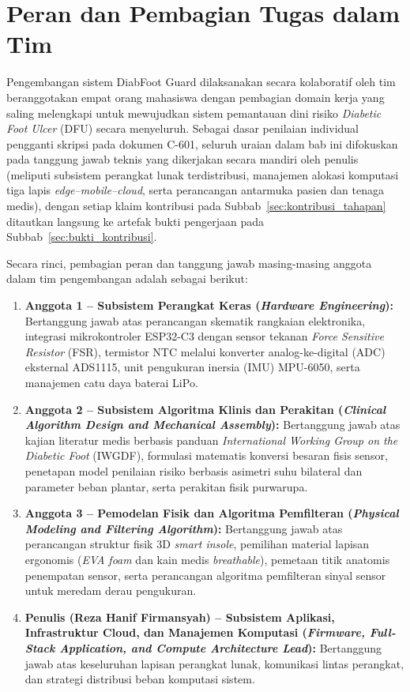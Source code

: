 \section{Peran dan Pembagian Tugas dalam Tim}
\label{sec:peran_tugas}

Pengembangan sistem DiabFoot Guard dilaksanakan secara kolaboratif oleh tim beranggotakan empat orang mahasiswa dengan pembagian domain kerja yang saling melengkapi untuk mewujudkan sistem pemantauan dini risiko \textit{Diabetic Foot Ulcer} (DFU) secara menyeluruh. Sebagai dasar penilaian individual pengganti skripsi pada dokumen C-601, seluruh uraian dalam bab ini difokuskan pada tanggung jawab teknis yang dikerjakan secara mandiri oleh penulis (meliputi subsistem perangkat lunak terdistribusi, manajemen alokasi komputasi tiga lapis \textit{edge--mobile--cloud}, serta perancangan antarmuka pasien dan tenaga medis), dengan setiap klaim kontribusi pada Subbab~\ref{sec:kontribusi_tahapan} ditautkan langsung ke artefak bukti pengerjaan pada Subbab~\ref{sec:bukti_kontribusi}.

Secara rinci, pembagian peran dan tanggung jawab masing-masing anggota dalam tim pengembangan adalah sebagai berikut:

\begin{enumerate}
    \item \textbf{Anggota 1 -- Subsistem Perangkat Keras (\textit{Hardware Engineering}):} Bertanggung jawab atas perancangan skematik rangkaian elektronika, integrasi mikrokontroler ESP32-C3 dengan sensor tekanan \textit{Force Sensitive Resistor} (FSR), termistor NTC melalui konverter analog-ke-digital (ADC) eksternal ADS1115, unit pengukuran inersia (IMU) MPU-6050, serta manajemen catu daya baterai LiPo.
    \item \textbf{Anggota 2 -- Subsistem Algoritma Klinis dan Perakitan (\textit{Clinical Algorithm Design and Mechanical Assembly}):} Bertanggung jawab atas kajian literatur medis berbasis panduan \textit{International Working Group on the Diabetic Foot} (IWGDF), formulasi matematis konversi besaran fisis sensor, penetapan model penilaian risiko berbasis asimetri suhu bilateral dan parameter beban plantar, serta perakitan fisik purwarupa.
    \item \textbf{Anggota 3 -- Pemodelan Fisik dan Algoritma Pemfilteran (\textit{Physical Modeling and Filtering Algorithm}):} Bertanggung jawab atas perancangan struktur fisik 3D \textit{smart insole}, pemilihan material lapisan ergonomis (\textit{EVA foam} dan kain medis \textit{breathable}), pemetaan titik anatomis penempatan sensor, serta perancangan algoritma pemfilteran sinyal sensor untuk meredam derau pengukuran.
    \item \textbf{Penulis (Reza Hanif Firmansyah) -- Subsistem Aplikasi, Infrastruktur Cloud, dan Manajemen Komputasi (\textit{Firmware, Full-Stack Application, and Compute Architecture Lead}):} Bertanggung jawab atas keseluruhan lapisan perangkat lunak, komunikasi lintas perangkat, dan strategi distribusi beban komputasi sistem.
\end{enumerate}

